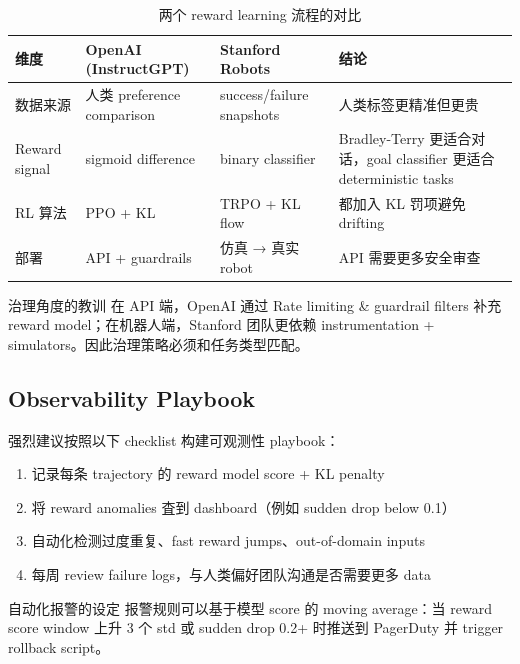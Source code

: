 \documentclass[a4paper]{article}
\begin{document}
\begin{table}[H]
\centering
\begin{tabular}{p{} p{} p{} p{}}
\toprule
维度 & OpenAI (InstructGPT) & Stanford Robots & 结论 \\
\midrule
数据来源 & 人类 preference comparison & success/failure snapshots & 人类标签更精准但更贵 \\
Reward signal & sigmoid difference & binary classifier & Bradley-Terry 更适合对话，goal classifier 更适合 deterministic tasks \\
RL 算法 & PPO + KL & TRPO + KL flow & 都加入 KL 罚项避免 drifting \\
部署 & API + guardrails & 仿真 → 真实 robot & API 需要更多安全审查 \\
\bottomrule
\end{tabular}
\caption{两个 reward learning 流程的对比}
\end{table}

\begin{warningbox}{治理角度的教训}
在 API 端，OpenAI 通过 Rate limiting & guardrail filters 补充 reward model；在机器人端，Stanford 团队更依赖 instrumentation + simulators。因此治理策略必须和任务类型匹配。
\end{warningbox}

\subsection{Observability Playbook}

强烈建议按照以下 checklist 构建可观测性 playbook：

\begin{enumerate}
    \item 记录每条 trajectory 的 reward model score + KL penalty
    \item 将 reward anomalies 査到 dashboard（例如 sudden drop below 0.1）
    \item 自动化检测过度重复、fast reward jumps、out-of-domain inputs
    \item 每周 review failure logs，与人类偏好团队沟通是否需要更多 data
\end{enumerate}

\begin{importantbox}{自动化报警的设定}
报警规则可以基于模型 score 的 moving average：当 reward score window 上升 3 个 std 或 sudden drop 0.2+ 时推送到 PagerDuty 并 trigger rollback script。
\end{importantbox}
\end{document}

